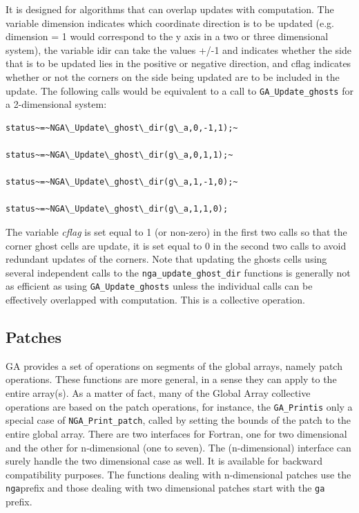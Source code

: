 It is designed for algorithms that can overlap updates with computation.
The variable dimension indicates which coordinate direction is to
be updated (e.g. dimension = 1 would correspond to the y axis in a
two or three dimensional system), the variable idir can take the values
+/-1 and indicates whether the side that is to be updated lies in
the positive or negative direction, and cflag indicates whether or
not the corners on the side being updated are to be included in the
update. The following calls would be equivalent to a call to \texttt{GA\_Update\_ghosts}
for a 2-dimensional system:
\begin{verbatim}
status~=~NGA\_Update\_ghost\_dir(g\_a,0,-1,1);~

status~=~NGA\_Update\_ghost\_dir(g\_a,0,1,1);~

status~=~NGA\_Update\_ghost\_dir(g\_a,1,-1,0);~

status~=~NGA\_Update\_ghost\_dir(g\_a,1,1,0);
\end{verbatim}
The variable \emph{cflag} is set equal to 1 (or non-zero) in the first
two calls so that the corner ghost cells are update, it is set equal
to 0 in the second two calls to avoid redundant updates of the corners.
Note that updating the ghosts cells using several independent calls
to the \texttt{nga\_update\_ghost\_dir} functions is generally not
as efficient as using \texttt{GA\_Update\_ghosts} unless the individual
calls can be effectively overlapped with computation. This is a collective
operation. 


\subsection{Patches }

GA provides a set of operations on segments of the global arrays,
namely patch operations. These functions are more general, in a sense
they can apply to the entire array(s). As a matter of fact, many of
the Global Array collective operations are based on the patch operations,
for instance, the \texttt{GA\_Printis} only a special case of \texttt{NGA\_Print\_patch},
called by setting the bounds of the patch to the entire global array.
There are two interfaces for Fortran, one for two dimensional and
the other for n-dimensional (one to seven). The (n-dimensional) interface
can surely handle the two dimensional case as well. It is available
for backward compatibility purposes. The functions dealing with n-dimensional
patches use the \textquotedbl{}\texttt{nga}\textquotedbl{}prefix and
those dealing with two dimensional patches start with the \textquotedbl{}\texttt{ga}\textquotedbl{}
prefix.


